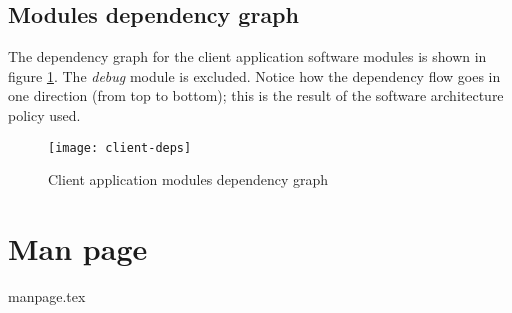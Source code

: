 \subsection{Modules dependency graph}
The dependency graph for the client application software modules is shown in
figure \ref{img:client-deps-graph}. The \emph{debug} module is excluded. Notice
how the dependency flow goes in one direction (from top to bottom); this is the
result of the software architecture policy used.
\begin{figure}[hbp]
\begin{centering}
  \texttt{[image: client-deps]}
  \caption{Client application modules dependency graph}
  \label{img:client-deps-graph}
\end{centering}
\end{figure}

\section{Man page}
\label{sec:client-manpage}
{
  \ttfamily
  {manpage.tex}
}
